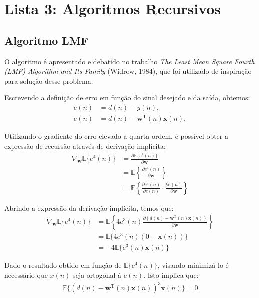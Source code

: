 \section{Lista 3: Algoritmos Recursivos} %


\subsection{Algoritmo LMF} %

O algoritmo é apresentado e debatido no trabalho \textit{The Least Mean Square Fourth (LMF) Algorithm
and Its Family} (Widrow, 1984), que foi utilizado de inspiração para solução desse problema.

Escrevendo a definição de erro em função do sinal desejado e da saída, obtemos:
\begin{align*}
    e(n) &= d(n) - y(n), \\
    e(n) &= d(n) - \mathbf{w}^{\text{T}}(n)\mathbf{x}(n),
\end{align*}

Utilizando o gradiente do erro elevado a quarta ordem, é possível obter a expressão de recursão através de derivação implícita:
\begin{align*}
    \nabla_{\mathbf{w}} \mathbb{E}\{e^{4}(n)\} &= \frac{\partial \mathbb{E}\{e^{4}(n)\}}{\partial \mathbf{w}} \\
    &= \mathbb{E} \left\{ \frac{\partial e^{4}(n)}{\partial \mathbf{w}}\right\} \\
    &= \mathbb{E}\left\{ \frac{\partial e^{4}(n)}{\partial e(n)} \cdot \frac{\partial e(n) }{\partial \mathbf{w}}\right\}
\end{align*}

Abrindo a expressão da derivação implícita, temos que:
\begin{align*}
    \nabla_{\mathbf{w}} \mathbb{E}\{e^{4}(n)\} &= \mathbb{E}\left\{4 e^{3}(n) \frac{\partial (d(n) - \mathbf{w}^{\text{T}}(n)\mathbf{x}(n)) }{\partial \mathbf{w}}\right\} \\
    &= \mathbb{E}\{4 e^{3}(n) (0 - \mathbf{x}(n))\} \\
    &= - 4 \mathbb{E}\{e^{3}(n) \mathbf{x}(n)\}
\end{align*}

Dado o resultado obtido em função de $\mathbb{E}\{e^{4}(n)\}$, visando minimizá-lo é necessário que $x(n)$ seja ortogonal à $e(n)$. Isto implica que:
\begin{align*}
    \mathbb{E}\{(d(n) - \mathbf{w}^{\text{T}}(n)\mathbf{x}(n))^{3} \mathbf{x}(n)\} = 0
\end{align*}

